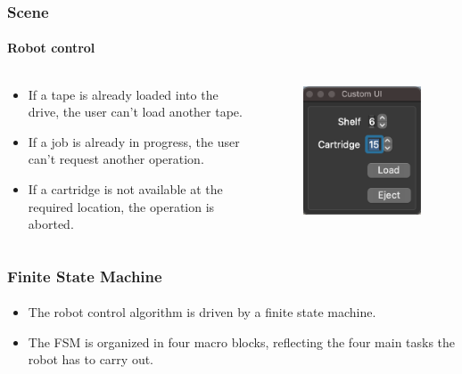 \documentclass[12pt]{beamer}
\begin{document}
\begin{frame}
\frametitle{Scene}
\framesubtitle{Robot control}
\begin{columns}[T]
\begin{column}{.48\textwidth}
\begin{itemize}
    \item If a tape is already loaded into the drive, the user can't load another tape.
    \item If a job is already in progress, the user can't request another operation.
    \item If a cartridge is not available at the required location, the operation is aborted.
\end{itemize}
\end{column}
\begin{column}{.48\textwidth}
\begin{figure}
    \centering
    \includegraphics[scale=.7]{img/interface.png}
\end{figure}
\end{column}
\end{columns}
\end{frame}

\begin{frame}
\frametitle{Finite State Machine}
\framesubtitle{}
\begin{itemize}
    \item The robot control algorithm is driven by a finite state machine.
    \item The FSM is organized in four macro blocks, reflecting the four main tasks the robot has to carry out.
\end{itemize}
\end{frame}
\end{document}
